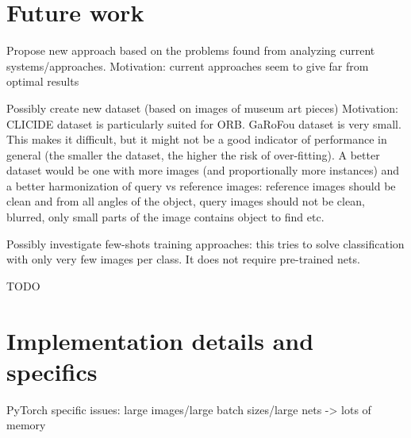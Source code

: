 \documentclass[fleqn]{article}
\begin{document}
\section{Future work}
Propose new approach based on the problems found from analyzing current
systems/approaches.
Motivation: current approaches seem to give far from optimal results

Possibly create new dataset (based on images of museum art pieces)
Motivation: CLICIDE dataset is particularly suited for ORB. GaRoFou
dataset is very small. This makes it difficult, but it might not be
a good indicator of performance in general (the smaller the dataset,
the higher the risk of over-fitting).
A better dataset would be one with more images
(and proportionally more instances) and a better harmonization of
query vs reference images: reference images should be clean and from
all angles of the object, query images should not be clean, blurred,
only small parts of the image contains object to find etc.

Possibly investigate few-shots training approaches: this tries to
solve classification with only very few images per class. It does not
require pre-trained nets.

TODO




\newpage
\appendix
\section{Implementation details and specifics}
PyTorch
specific issues: large images/large batch sizes/large nets -> lots of memory
\end{document}
